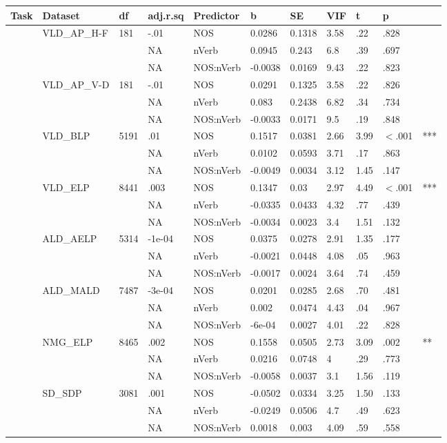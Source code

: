 \begin{table}[ht]
\centering
\begingroup\normalsize
\begin{tabular}{lllllllllll}
  \hline
Task & Dataset & df & adj.r.sq & Predictor & b & SE & VIF & t & p &  \\ 
  \hline
 & VLD\_AP\_H-F & 181 & -.01 & NOS & 0.0286 & 0.1318 & 3.58 & .22 & .828 &   \\ 
   &  &  & NA & nVerb & 0.0945 & 0.243 & 6.8 & .39 & .697 &   \\ 
   &  &  & NA & NOS:nVerb & -0.0038 & 0.0169 & 9.43 & .22 & .823 &   \\ 
   & VLD\_AP\_V-D & 181 & -.01 & NOS & 0.0291 & 0.1325 & 3.58 & .22 & .826 &   \\ 
   &  &  & NA & nVerb & 0.083 & 0.2438 & 6.82 & .34 & .734 &   \\ 
   &  &  & NA & NOS:nVerb & -0.0033 & 0.0171 & 9.5 & .19 & .848 &   \\ 
   & VLD\_BLP & 5191 & .01 & NOS & 0.1517 & 0.0381 & 2.66 & 3.99 & $<$.001 & *** \\ 
   &  &  & NA & nVerb & 0.0102 & 0.0593 & 3.71 & .17 & .863 &   \\ 
   &  &  & NA & NOS:nVerb & -0.0049 & 0.0034 & 3.12 & 1.45 & .147 &   \\ 
   & VLD\_ELP & 8441 & .003 & NOS & 0.1347 & 0.03 & 2.97 & 4.49 & $<$.001 & *** \\ 
   &  &  & NA & nVerb & -0.0335 & 0.0433 & 4.32 & .77 & .439 &   \\ 
   &  &  & NA & NOS:nVerb & -0.0034 & 0.0023 & 3.4 & 1.51 & .132 &   \\ 
   & ALD\_AELP & 5314 & -1e-04 & NOS & 0.0375 & 0.0278 & 2.91 & 1.35 & .177 &   \\ 
   &  &  & NA & nVerb & -0.0021 & 0.0448 & 4.08 & .05 & .963 &   \\ 
   &  &  & NA & NOS:nVerb & -0.0017 & 0.0024 & 3.64 & .74 & .459 &   \\ 
   & ALD\_MALD & 7487 & -3e-04 & NOS & 0.0201 & 0.0285 & 2.68 & .70 & .481 &   \\ 
   &  &  & NA & nVerb & 0.002 & 0.0474 & 4.43 & .04 & .967 &   \\ 
   &  &  & NA & NOS:nVerb & -6e-04 & 0.0027 & 4.01 & .22 & .828 &   \\ 
   & NMG\_ELP & 8465 & .002 & NOS & 0.1558 & 0.0505 & 2.73 & 3.09 & .002 & ** \\ 
   &  &  & NA & nVerb & 0.0216 & 0.0748 & 4 & .29 & .773 &   \\ 
   &  &  & NA & NOS:nVerb & -0.0058 & 0.0037 & 3.1 & 1.56 & .119 &   \\ 
   & SD\_SDP & 3081 & .001 & NOS & -0.0502 & 0.0334 & 3.25 & 1.50 & .133 &   \\ 
   &  &  & NA & nVerb & -0.0249 & 0.0506 & 4.7 & .49 & .623 &   \\ 
   &  &  & NA & NOS:nVerb & 0.0018 & 0.003 & 4.09 & .59 & .558 &   \\ 
   \hline
\end{tabular}
\endgroup
\end{table}
